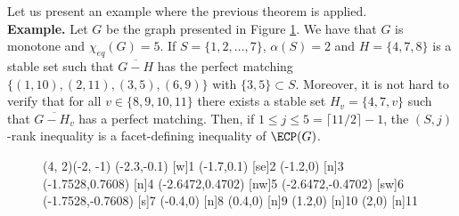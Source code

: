 Let us present an example where the previous theorem is applied.\\

\noindent \textbf{Example.}
Let $G$ be the graph presented in Figure \ref{minigraph1}. We have that $G$ is monotone and $\chi_{eq}(G) = 5$. 
If $S = \{1,2,\ldots,7\}$, $\alpha(S) = 2$ and $H = \{4, 7, 8\}$ is a stable set such that $\overline{G - H}$ has the perfect matching $\{(1,10), (2,11), (3,5), (6,9)\}$ with $\{3,5\}\subset S$. Moreover, it is not hard to verify that for all $v \in \{8,9,10,11\}$ there exists a stable set $H_v = \{ 4, 7, v\}$ such that $\overline{G - H_v}$ has a perfect matching.
Then, if $1 \leq j \leq 5=\lceil 11/2 \rceil-1$, the $(S,j)$-rank inequality is a facet-defining inequality of $\ECP(G)$.  
\begin{figure}[h]
  \centering
\begin{graph}(4, 2)(-2, -1)
	(-2.3,-0.1)
	{1}
	(-1.7,0.1)
	[se]{2}
	(-1.2,0)
	{3}
	(-1.7528,0.7608)
	{4}
	(-2.6472,0.4702)
	[nw]{5}
	(-2.6472,-0.4702)
	[sw]{6}
	(-1.7528,-0.7608)
	{7}
	(-0.4,0)
	{8}
	(0.4,0)
	{9}
	(1.2,0)
	{10}
	(2,0)
	{11}
\end{graph}
  \caption{}
  \label{minigraph1}
\end{figure}

